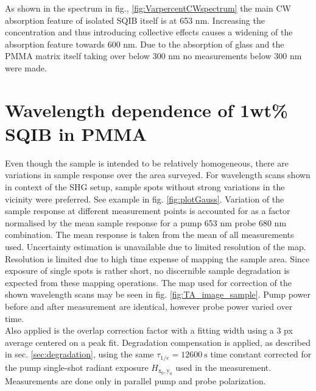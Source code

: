 \documentclass[twoside,openright,listof=numbered]{scrreprt}
\def\radiantExp{\ensuremath{H_\mathrm{x_0,y_0}}}
\begin{document}
As shown in the spectrum in fig., \ref{fig:VarpercentCWspectrum} the main CW absorption feature of isolated SQIB itself is at 653 nm. Increasing the concentration and thus introducing collective effects causes a widening of the absorption feature towards 600 nm. Due to the absorption of glass and the PMMA matrix itself taking over below 300 nm no measurements below 300 nm were made.\\

\section{Wavelength dependence of 1wt\% SQIB in PMMA}


Even though the sample is intended to be relatively homogeneous, there are variations in sample response over the area surveyed. For wavelength scans shown in context of the SHG setup, sample spots without strong variations in the vicinity were preferred. See example in fig. \ref{fig:plotGauss}. Variation of the sample response at different measurement points is accounted for as a factor normalised by the mean sample response for a pump 653 nm probe 680 nm combination. The mean response is taken from the mean of all measurements used. Uncertainty estimation is unavailable due to limited resolution of the map. Resolution is limited due to high time expense of mapping the sample area. Since exposure of single spots is rather short, no discernible sample degradation is expected from these mapping operations. The map used for correction of the shown wavelength scans may be seen in fig. \ref{fig:TA_image_sample}. Pump power before and after measurement are identical, however probe power varied over time.\\
Also applied is the overlap correction factor with a fitting width using a 3 px average centered on a peak fit. Degradation compensation is applied, as described in sec. \ref{sec:degradation}, using the same $\tau_{1/e} = \SI{12600}{\second}$ time constant corrected for the pump single-shot radiant exposure $\radiantExp$ used in the measurement.
Measurements are done only in parallel pump and probe polarization.\\
\end{document}
